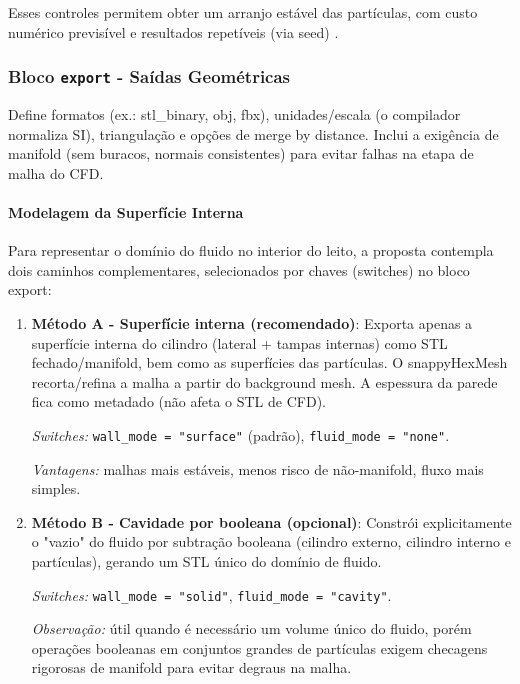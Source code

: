 Esses controles permitem obter um arranjo estável das partículas, com custo numérico previsível e resultados repetíveis (via seed) \cite{blender2021}.

\subsubsection{Bloco \texttt{export} - Saídas Geométricas}

Define formatos (ex.: stl\_binary, obj, fbx), unidades/escala (o compilador normaliza SI), triangulação e opções de merge by distance. Inclui a exigência de manifold (sem buracos, normais consistentes) para evitar falhas na etapa de malha do CFD.

\paragraph{Modelagem da Superfície Interna}

Para representar o domínio do fluido no interior do leito, a proposta contempla dois caminhos complementares, selecionados por chaves (switches) no bloco export:

\begin{enumerate}
    \item \textbf{Método A - Superfície interna (recomendado)}:
    Exporta apenas a superfície interna do cilindro (lateral + tampas internas) como STL fechado/manifold, bem como as superfícies das partículas. O snappyHexMesh recorta/refina a malha a partir do background mesh. A espessura da parede fica como metadado (não afeta o STL de CFD).
    
    \textit{Switches:} \texttt{wall\_mode = "surface"} (padrão), \texttt{fluid\_mode = "none"}.
    
    \textit{Vantagens:} malhas mais estáveis, menos risco de não-manifold, fluxo mais simples.
    
    \item \textbf{Método B - Cavidade por booleana (opcional)}:
    Constrói explicitamente o "vazio" do fluido por subtração booleana (cilindro externo, cilindro interno e partículas), gerando um STL único do domínio de fluido.
    
    \textit{Switches:} \texttt{wall\_mode = "solid"}, \texttt{fluid\_mode = "cavity"}.
    
    \textit{Observação:} útil quando é necessário um volume único do fluido, porém operações booleanas em conjuntos grandes de partículas exigem checagens rigorosas de manifold para evitar degraus na malha.
\end{enumerate}


